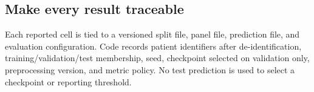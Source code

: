 \begin{table}[t]
\centering\small
\setlength{\tabcolsep}{3.5pt}
\caption{Cross-organ evaluation resources. Exact patient-level partitions are released as machine-readable files.}
\label{tab:data}
\end{table}

\subsection{Make every result traceable}
Each reported cell is tied to a versioned split file, panel file, prediction file, and evaluation
configuration. Code records patient identifiers after de-identification, training/validation/test
membership, seed, checkpoint selected on validation only, preprocessing version, and metric policy.
No test prediction is used to select a checkpoint or reporting threshold.
